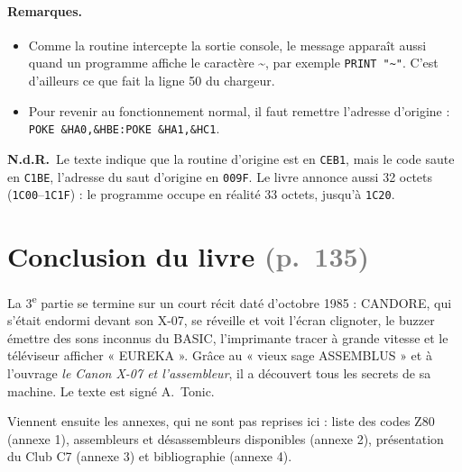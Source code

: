 \documentclass[a4paper,10pt]{article}
\newcommand{\hex}[1]{\texttt{#1}}
\newcommand{\pg}[1]{\texorpdfstring{\textcolor{gray}{\small(p.~#1)}}{}}
\newcommand{\nota}[1]{\textcolor{red!60!black}{\small\textbf{N.d.R.}~#1}}
\begin{document}
\paragraph{Remarques.}
\begin{itemize}
  \item Comme la routine intercepte la sortie console, le message apparaît
        aussi quand un programme affiche le caractère \textasciitilde, par
        exemple \texttt{PRINT "\textasciitilde"}. C'est d'ailleurs ce que
        fait la ligne 50 du chargeur.
  \item Pour revenir au fonctionnement normal, il faut remettre l'adresse
        d'origine : \texttt{POKE \&HA0,\&HBE:POKE \&HA1,\&HC1}.
\end{itemize}
\nota{Le texte indique que la routine d'origine est en \hex{CEB1}, mais le
code saute en \hex{C1BE}, l'adresse du saut d'origine en \hex{009F}. Le
livre annonce aussi 32 octets (\hex{1C00}--\hex{1C1F}) : le programme
occupe en réalité 33 octets, jusqu'à \hex{1C20}.}

\section{Conclusion du livre \pg{135}}

La 3\textsuperscript{e} partie se termine sur un court récit daté
d'octobre 1985 : CANDORE, qui s'était endormi devant son X-07, se réveille
et voit l'écran clignoter, le buzzer émettre des sons inconnus du BASIC,
l'imprimante tracer à grande vitesse et le téléviseur afficher
« EUREKA ». Grâce au « vieux sage ASSEMBLUS » et à l'ouvrage \emph{le
Canon X-07 et l'assembleur}, il a découvert tous les secrets de sa
machine. Le texte est signé A.~Tonic.

Viennent ensuite les annexes, qui ne sont pas reprises ici : liste des codes
Z80 (annexe 1), assembleurs et désassembleurs disponibles (annexe 2),
présentation du Club C7 (annexe 3) et bibliographie (annexe 4).
\end{document}
